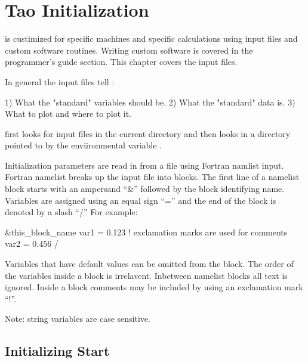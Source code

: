 \chapter{Tao Initialization}
\label{c:init}

\tao is custimized for specific machines and specific calculations
using input files and custom software routines. Writing custom software is
covered in the programmer's guide section. This chapter covers the
input files. 

In general the input files tell \tao:
\begin{example}
  1) What the "standard" variables should be.
  2) What the "standard" data is.
  3) What to plot and where to plot it.
\end{example}

\tao first looks for input files in the current directory and then
looks in a directory pointed to by the enviironmental variable
.

Initialization parameters are read in from a file using Fortran
namlist input. Fortran namelist breaks up the input file into
blocks. The first line of a namelist block starts with an ampersand ``\&''
followed by the block identifying name. Variables are assigned using
an equal sign ``='' and the end of the block is denoted by a slash ``/''
For example:
\begin{example}
  \&this_block_name
    var1 = 0.123   ! exclamation marks are used for comments
    var2 = 0.456
  /
\end{example}
Variables that have default values can be omitted from the block.  The
order of the variables inside a block is irrelavent.  Inbetween
namelist blocks all text is ignored. Inside a block comments may be
included by using an exclamation mark ``!''.

Note: string variables are case sensitive.

\section{Initializing Start}
\label{s:init_global} 

